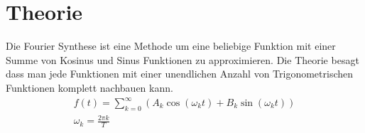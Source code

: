 \section{Theorie}
\label{sec:Theorie}
Die Fourier Synthese ist eine Methode um eine beliebige Funktion mit einer Summe von Kosinus und Sinus Funktionen zu approximieren.
Die Theorie besagt dass man jede Funktionen mit einer unendlichen Anzahl von Trigonometrischen Funktionen komplett nachbauen kann.
\begin{gather}
    f(t) = \sum_{k=0}^{\infty} (A_k\cos(\omega_k t)+B_k\sin(\omega_k t))\\
    \omega_k = \frac{2\pi k}{T}
\end{gather}
\cite{sample}
